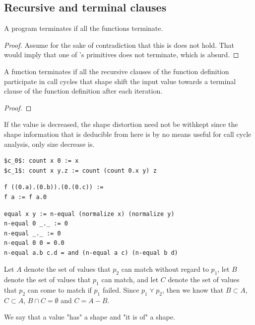\subsection{Recursive and terminal clauses}

\begin{lemma}
A program terminates if all the functions terminate.
\end{lemma}

\begin{proof} Assume for the sake of contradiction that this is does not hold.
That would imply that one of \D{}'s primitives does not terminate, which is
absurd.  \end{proof}

\begin{lemma} A function terminates if all the recursive clauses of the
function definition participate in call cycles that shape shift the input value
towards a terminal clause of the function definition after each iteration.
\end{lemma}

\begin{proof}

\end{proof}


If the value is decreased, the shape distortion need not be withkept since the
shape information that is deducible from here is by no means useful for call
cycle analysis, only size decrease is.

\begin{lstlisting}
$c_0$: count x 0 := x
$c_1$: count x y.z := count (count 0.x y) z
\end{lstlisting}

\begin{lstlisting}
f ((0.a).(0.b)).(0.(0.c)) := 
f a := f a.0
\end{lstlisting}

\begin{verbatim}
equal x y := n-equal (normalize x) (normalize y)
n-equal 0 _._ := 0
n-equal _._ := 0
n-equal 0 0 = 0.0
n-equal a.b c.d = and (n-equal a c) (n-equal b d)
\end{verbatim}

Let $A$ denote the set of values that $p_2$ can
match without regard to $p_1$, let $B$ denote the set of values that $p_1$ can
match, and let $C$ denote the set of values that $p_2$ can come to match if
$p_1$ failed. Since $p_1\curlyvee p_2$, then we know that $B\subset A$,
$C\subset A$, $B\cap C=\emptyset$ and $C=A-B$.



We say that a value "has" a shape and "it is of" a shape.
